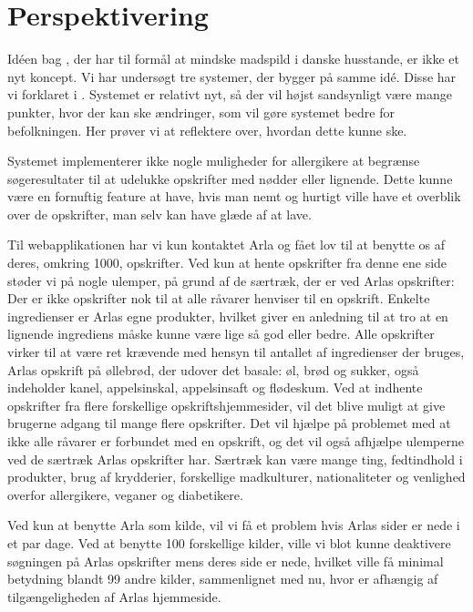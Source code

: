 \section{Perspektivering}
\label{sec:perspektivering}
Idéen bag \Foodl{}, der har til formål at mindske madspild i danske husstande, er ikke et nyt koncept. Vi har undersøgt tre systemer, der bygger på samme idé. Disse har vi forklaret i . Systemet er relativt nyt, så der vil højst sandsynligt være mange punkter, hvor der kan ske ændringer, som vil gøre systemet bedre for befolkningen. Her prøver vi at reflektere over, hvordan dette kunne ske.

Systemet \Foodl{} implementerer ikke nogle muligheder for \fx allergikere at begrænse søgeresultater til \fx at udelukke opskrifter med nødder eller lignende. Dette kunne være en fornuftig feature at have, hvis man nemt og hurtigt ville have et overblik over de opskrifter, man selv kan have glæde af at lave.

Til webapplikationen \Foodl{} har vi kun kontaktet Arla og fået lov til at benytte os af deres, omkring 1000, opskrifter. Ved kun at hente opskrifter fra denne ene side støder vi på nogle ulemper, på grund af de særtræk, der er ved Arlas opskrifter: Der er ikke opskrifter nok til at alle råvarer henviser til en opskrift. Enkelte ingredienser er Arlas egne produkter, hvilket giver en anledning til at tro at en lignende ingrediens måske kunne være lige så god eller bedre. Alle opskrifter virker til at være ret krævende med hensyn til antallet af ingredienser der bruges, \fx Arlas opskrift på øllebrød, der udover det basale: øl, brød og sukker, også indeholder kanel, appelsinskal, appelsinsaft og flødeskum. Ved at indhente opskrifter fra flere forskellige opskriftshjemmesider, vil det blive muligt at give brugerne adgang til mange flere opskrifter. Det vil hjælpe på problemet med at ikke alle råvarer er forbundet med en opskrift, og det vil også afhjælpe ulemperne ved de særtræk Arlas opskrifter har. Særtræk kan være mange ting, \fx fedtindhold i produkter, brug af krydderier, forskellige madkulturer, nationaliteter og venlighed overfor allergikere, veganer og diabetikere.

Ved kun at benytte Arla som kilde, vil vi få et problem hvis Arlas sider er nede i et par dage. Ved at benytte 100 forskellige kilder, ville vi blot kunne deaktivere søgningen på Arlas opskrifter mens deres side er nede, hvilket ville få minimal betydning blandt 99 andre kilder, sammenlignet med nu, hvor \Foodl er afhængig af tilgængeligheden af Arlas hjemmeside.

